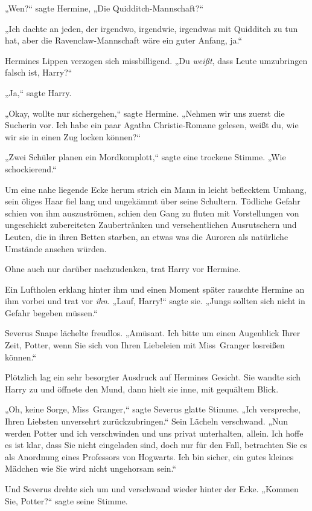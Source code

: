 {„Wen?“ sagte Hermine, „Die Quidditch-Mannschaft?“

„Ich dachte an jeden, der irgendwo, irgendwie, irgendwas mit Quidditch zu tun hat, aber die Ravenclaw-Mannschaft wäre ein guter Anfang, ja.“

Hermines Lippen verzogen sich missbilligend. „Du \emph{weißt}, dass Leute umzubringen falsch ist, Harry?“

„Ja,“ sagte Harry.

„Okay, wollte nur sichergehen,“ sagte Hermine. „Nehmen wir uns zuerst die Sucherin vor. Ich habe ein paar Agatha Christie-Romane gelesen, weißt du, wie wir sie in einen Zug locken können?“

„Zwei Schüler planen ein Mordkomplott,“ sagte eine trockene Stimme. „Wie schockierend.“

Um eine nahe liegende Ecke herum strich ein Mann in leicht beflecktem Umhang, sein öliges Haar fiel lang und ungekämmt über seine Schultern. Tödliche Gefahr schien von ihm auszuströmen, schien den Gang zu fluten mit Vorstellungen von ungeschickt zubereiteten Zaubertränken und versehentlichen Ausrutschern und Leuten, die in ihren Betten starben, an etwas was die Auroren als natürliche Umstände ansehen würden.

Ohne auch nur darüber nachzudenken, trat Harry vor Hermine.

Ein Luftholen erklang hinter ihm und einen Moment später rauschte Hermine an ihm vorbei und trat vor \emph{ihn}. „Lauf, Harry!“ sagte sie. „Jungs sollten sich nicht in Gefahr begeben müssen.“

Severus Snape lächelte freudlos. „Amüsant. Ich bitte um einen Augenblick Ihrer Zeit, Potter, wenn Sie sich von Ihren Liebeleien mit Miss~Granger losreißen können.“

Plötzlich lag ein sehr besorgter Ausdruck auf Hermines Gesicht. Sie wandte sich Harry zu und öffnete den Mund, dann hielt sie inne, mit gequältem Blick.

„Oh, keine Sorge, Miss~Granger,“ sagte Severus glatte Stimme. „Ich verspreche, Ihren Liebsten unversehrt zurückzubringen.“ Sein Lächeln verschwand. „Nun werden Potter und ich verschwinden und uns privat unterhalten, allein. Ich hoffe es ist klar, dass Sie nicht eingeladen sind, doch nur für den Fall, betrachten Sie es als Anordnung eines Professors von Hogwarts. Ich bin sicher, ein gutes kleines Mädchen wie Sie wird nicht ungehorsam sein.“

Und Severus drehte sich um und verschwand wieder hinter der Ecke. „Kommen Sie, Potter?“ sagte seine Stimme.

}
